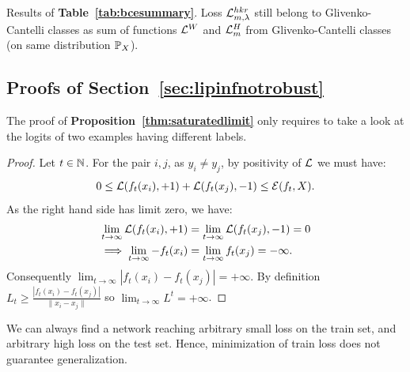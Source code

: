     Results of \textbf{Table~\ref{tab:bcesummary}}. Loss $\mathcal{L}^{hkr}_{m,\lambda}$ still belong to Glivenko-Cantelli classes as sum of functions $\mathcal{L}^W$ and $\mathcal{L}^H_m$ from Glivenko-Cantelli classes (on same distribution $\mathbb{P}_X$).   
      
    \subsection{Proofs of Section~\ref{sec:lipinfnotrobust}}\label{app:lipinfnotrobust}
    
    \saturatedlimit*
      
        The proof of \textbf{Proposition~\ref{thm:saturatedlimit}} only requires to take a look at the logits of two examples having different labels.  
        
        \begin{proof}
            Let $t\in\mathbb{N}$. For the pair $i,j$, as $y_i\neq y_j$, by positivity of $\mathcal{L}$ we must have:
            \begin{equation}
                0\leq\mathcal{L}(f_t(x_i),+1)+\mathcal{L}(f_t(x_j),-1)\leq\mathcal{E}(f_t,X).
            \end{equation}
            As the right hand side has limit zero, we have:
            \begin{equation}
                \begin{split}
                    \lim\limits_{t\rightarrow\infty}\mathcal{L}(f_t(x_i),+1)&=\lim\limits_{t\rightarrow\infty}\mathcal{L}(f_t(x_j),-1)=0\\
                    \implies\lim\limits_{t\rightarrow\infty}-f_t(x_i)&=\lim\limits_{t\rightarrow\infty}f_t(x_j)=-\infty.
                \end{split}
            \end{equation}
            Consequently $\lim_{t\rightarrow\infty}|f_t(x_i)-f_t(x_j)|=+\infty$. By definition $L_t\geq \frac{|f_t(x_i)-f_t(x_j)|}{\|x_i-x_j\|}$ so $\lim_{t\rightarrow\infty}L^t=+\infty$.   
        \end{proof}  
        
        We can always find a network reaching arbitrary small loss on the train set, and arbitrary high loss on the test set. Hence, minimization of train loss does not guarantee generalization. 
          
